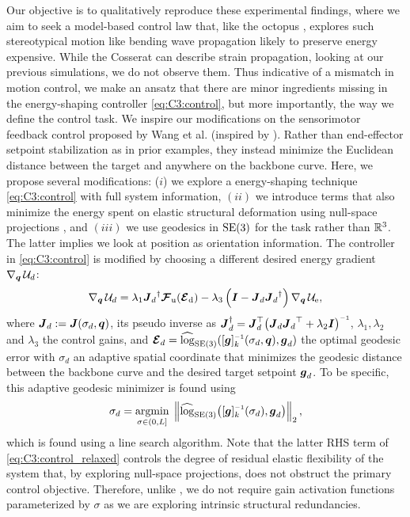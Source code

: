 Our objective is to qualitatively reproduce these experimental findings, where we aim to seek a model-based control law that, like the octopus \cite{Sumbre2001Sep}, explores such stereotypical motion like bending wave propagation likely to preserve energy expensive. While the Cosserat can describe strain propagation, looking at our previous simulations, we do not observe them. Thus indicative of a mismatch in motion control, we make an ansatz that there are minor ingredients missing in the energy-shaping controller \eqref{eq:C3:control}, but more importantly, the way we define the control task. We inspire our modifications on the sensorimotor feedback control proposed by Wang et al. \cite{Wang2022Dec} (inspired by \cite{Justh2006Jun}). Rather than end-effector setpoint stabilization as in prior examples, they instead minimize the Euclidean distance between the target and anywhere on the backbone curve. Here, we propose several modifications: ($i$) we explore a energy-shaping technique \eqref{eq:C3:control} with full system information, $(ii)$ we introduce terms that also minimize the energy spent on elastic structural deformation using null-space projections \cite{Murray1994,Spong2006}, and $(iii)$ we use geodesics in $\textup{\textrm{SE}}(3)$ for the task rather than $\mathbb{R}^3$. The latter implies we look at position as orientation information. The controller in \eqref{eq:C3:control} is modified by choosing a different desired energy gradient $\nabla_{\boldsymbol{q}} \,\mathcal{U}_d$:
%
\begin{equation}
\nabla_{\boldsymbol{q}}\, \mathcal{U}_d = \lambda_1 {{\boldsymbol{J}}_d}^\dag\boldsymbol{\mathcal{F}}_\textrm{u}(\boldsymbol{\mathcal{E}}_{\textrm{d}}) - \lambda_3 \left({\boldsymbol{I}} - {\boldsymbol{J}}_{d} {{\boldsymbol{J}}_{d}}^\dag\right) \nabla_{\boldsymbol{q}}\,\mathcal{U}_{\scriptstyle\textrm{e}},
\label{eq:C3:control_relaxed}
\end{equation}
%
where ${\boldsymbol{J}}_d := {\boldsymbol{J}}(\sigma_d,{\boldsymbol{q}})$, its pseudo inverse as $\JB_d^\dag = \mat{J}_d^\top\bigl(\JB_d {\JB_d}^\top + \lambda_2 \mat{I} \bigr)\inv$, $\lambda_1,\lambda_2$ and $\lambda_3$ the control gains, and ${\ten{E}}_d = \widehat{\log}_{\textrm{SE}(3)}([\gB]_k\inv(\sigma_d,\q),\gB_d)$ the optimal geodesic error with $\sigma_d$ an adaptive spatial coordinate that minimizes the geodesic distance between the backbone curve and the desired target setpoint ${\boldsymbol{g}}_d$. To be specific, this adaptive geodesic minimizer is found using
%
\begin{equation}
\sigma_d = \underset{\sigma \in (0,L]}{\textrm{argmin}} \;  \left\lVert \widehat{\log}_{\textrm{SE}(3)}\big([\gB]_k\inv(\sigma_d),\gB_d \big) \right\rVert_2,
\end{equation}
%
which is found using a line search algorithm. Note that the latter RHS term of \eqref{eq:C3:control_relaxed} controls the degree of residual elastic flexibility of the system that, by exploring null-space projections, does not obstruct the primary control objective. Therefore, unlike \cite{Wang2022Dec}, we do not require gain activation functions parameterized by $\sigma$ as we are exploring intrinsic structural redundancies.

